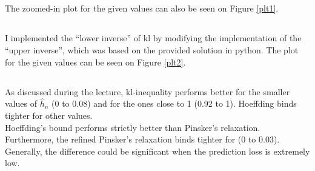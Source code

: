 \documentclass[a4paper]{article}
\begin{document}
\subsection{}
\label{subsec:23}
The zoomed-in plot for the given values can also be seen on Figure \ref{plt1}.

\subsection{}
\label{subsec:24}
I implemented the ``lower inverse'' of kl by modifying the implementation of the
``upper inverse'', which was based on the provided solution in
python.
The plot for the given values can be seen on Figure \ref{plt2}.

\subsection{}
\label{subsec:25}
As discussed during the lecture, kl-inequality performs better for the smaller
values of $\hat{h}_n$ (0 to 0.08) and for the ones close to 1 (0.92 to 1).
Hoeffding binds tighter for other values. \\
Hoeffding's bound performs strictly better than Pinsker's relaxation.
Furthermore, the refined Pinsker's relaxation binds tighter for (0 to 0.03).
Generally, the difference could be significant when the prediction loss is
extremely low.
\end{document}
